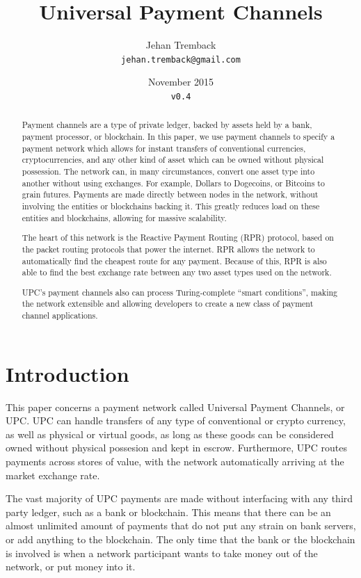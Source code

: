 \documentclass[a4paper]{article}
\title{Universal Payment Channels}
\author{Jehan Tremback\\
\texttt{jehan.tremback@gmail.com}\\}
\date{November 2015\\
\texttt{v0.4}}
\begin{document}
\maketitle

\begin{abstract}
Payment channels are a type of private ledger, backed by assets held by a bank, payment processor, or blockchain. In this paper, we use payment channels to specify a payment network which allows for instant transfers of conventional currencies, cryptocurrencies, and any other kind of asset which can be owned without physical possession. The network can, in many circumstances, convert one asset type into another without using exchanges. For example, Dollars to Dogecoins, or Bitcoins to grain futures. Payments are made directly between nodes in the network, without involving the entities or blockchains backing it. This greatly reduces load on these entities and blockchains, allowing for massive scalability.

The heart of this network is the Reactive Payment Routing (RPR) protocol, based on the packet routing protocols that power the internet. RPR allows the network to automatically find the cheapest route for any payment. Because of this, RPR is also able to find the best exchange rate between any two asset types used on the network.

UPC's payment channels also can process Turing-complete ``smart conditions'', making the network extensible and allowing developers to create a new class of payment channel applications.
\end{abstract}

\section*{Introduction}

This paper concerns a payment network called Universal Payment Channels, or UPC. UPC can handle transfers of any type of conventional or crypto currency, as well as physical or virtual goods, as long as these goods can be considered owned without physical possesion and kept in escrow. Furthermore, UPC routes payments across stores of value, with the network automatically arriving at the market exchange rate.

The vast majority of UPC payments are made without interfacing with any third party ledger, such as a bank or blockchain. This means that there can be an almost unlimited amount of payments that do not put any strain on bank servers, or add anything to the blockchain. The only time that the bank or the blockchain is involved is when a network participant wants to take money out of the network, or put money into it.
\end{document}
